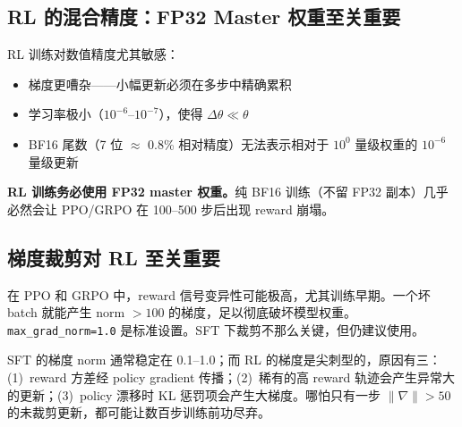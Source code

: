 \subsection{RL 的混合精度：FP32 Master 权重至关重要}
\label{mixed-precision-for-rl-fp32-master-weights-are-critical}

RL 训练对数值精度尤其敏感：

\begin{itemize}
  \item 梯度更嘈杂——小幅更新必须在多步中精确累积
  \item 学习率极小（$10^{-6}$--$10^{-7}$），使得 $\Delta\theta \ll \theta$
  \item BF16 尾数（7 位 $\approx$ 0.8\% 相对精度）无法表示相对于 $10^{0}$ 量级权重的 $10^{-6}$ 量级更新
\end{itemize}

\textbf{RL 训练务必使用 FP32 master 权重。}纯 BF16 训练（不留 FP32 副本）几乎必然会让 PPO/GRPO 在 100--500 步后出现 reward 崩塌。

\subsection{梯度裁剪对 RL 至关重要}
\label{gradient-clipping-is-critical-for-rl}

在 PPO 和 GRPO 中，reward 信号变异性可能极高，尤其训练早期。一个坏 batch 就能产生 norm $>100$ 的梯度，足以彻底破坏模型权重。\texttt{max\_grad\_norm=1.0} 是标准设置。SFT 下裁剪不那么关键，但仍建议使用。

\begin{warningbox}[RL 训练绝不要关闭梯度裁剪]
SFT 的梯度 norm 通常稳定在 0.1--1.0；而 RL 的梯度是尖刺型的，原因有三：(1)~reward 方差经 policy gradient 传播；(2)~稀有的高 reward 轨迹会产生异常大的更新；(3)~policy 漂移时 KL 惩罚项会产生大梯度。哪怕只有一步 $\|\nabla\| > 50$ 的未裁剪更新，都可能让数百步训练前功尽弃。
\end{warningbox}

